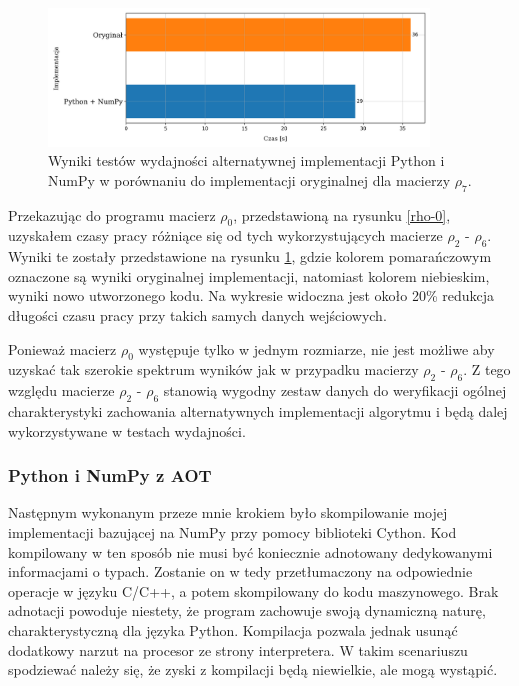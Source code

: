 \documentclass[10pt, a4paper]{article}
\begin{document}
\begin{sloppypar}
    \begin{figure}[ht]
      \centering
      \includegraphics[width=0.9\textwidth]{"resources/benchmark_2/plot2.png"}
      \caption{Wyniki testów wydajności alternatywnej implementacji Python i NumPy w porównaniu do implementacji oryginalnej dla macierzy $\rho
      _{7}$.}
      \label{first-alt-perf}
    \end{figure}
    \FloatBarrier

    Przekazując do programu macierz $\rho_{0}$, przedstawioną na rysunku \ref{rho-0}, uzyskałem
    czasy pracy różniące się od tych wykorzystujących macierze $\rho_{2}$ - $\rho_{6}$.
    Wyniki te zostały przedstawione na rysunku \ref{first-alt-perf}, gdzie kolorem pomarańczowym
    oznaczone są wyniki oryginalnej implementacji, natomiast kolorem niebieskim, wyniki nowo
    utworzonego kodu. Na wykresie widoczna jest około 20\% redukcja długości czasu pracy
    przy takich samych danych wejściowych.

    Ponieważ macierz $\rho_{0}$ występuje tylko w jednym rozmiarze, nie jest możliwe aby
    uzyskać tak szerokie spektrum wyników jak w przypadku macierzy $\rho_{2}$ -
    $\rho_{6}$. Z tego względu macierze $\rho_{2}$ - $\rho_{6}$ stanowią wygodny zestaw danych
    do weryfikacji ogólnej charakterystyki zachowania alternatywnych implementacji algorytmu
    i będą dalej wykorzystywane w testach wydajności.

    \subsubsection{ Python i NumPy z AOT }


    Następnym wykonanym przeze mnie krokiem było skompilowanie mojej implementacji bazującej
    na NumPy przy pomocy biblioteki Cython. Kod kompilowany w ten sposób nie musi być
    koniecznie adnotowany dedykowanymi informacjami o typach. Zostanie on w tedy przetłumaczony
    na odpowiednie operacje w języku C/C++, a potem skompilowany do kodu maszynowego. Brak
    adnotacji powoduje niestety, że program zachowuje swoją dynamiczną naturę, charakterystyczną
    dla języka Python. Kompilacja pozwala jednak usunąć dodatkowy narzut na procesor ze
    strony interpretera. W takim scenariuszu spodziewać należy się, że zyski z
    kompilacji będą niewielkie, ale mogą wystąpić.


\end{sloppypar}
\end{document}
